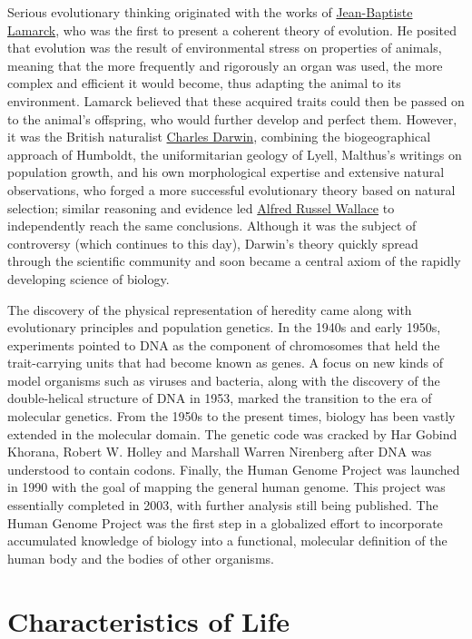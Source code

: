 Serious evolutionary thinking originated with the works of \href{https://en.wikipedia.org/wiki/Jean-Baptiste_Lamarck}{Jean-Baptiste Lamarck}, who was the first to present a coherent theory of evolution. He posited that evolution was the result of environmental stress on properties of animals, meaning that the more frequently and rigorously an organ was used, the more complex and efficient it would become, thus adapting the animal to its environment. Lamarck believed that these acquired traits could then be passed on to the animal's offspring, who would further develop and perfect them. However, it was the British naturalist \href{https://en.wikipedia.org/wiki/Charles_Darwin}{Charles Darwin}, combining the biogeographical approach of Humboldt, the uniformitarian geology of Lyell, Malthus's writings on population growth, and his own morphological expertise and extensive natural observations, who forged a more successful evolutionary theory based on natural selection; similar reasoning and evidence led \href{https://en.wikipedia.org/wiki/Alfred_Russel_Wallace}{Alfred Russel Wallace} to independently reach the same conclusions. Although it was the subject of controversy (which continues to this day), Darwin's theory quickly spread through the scientific community and soon became a central axiom of the rapidly developing science of biology.

The discovery of the physical representation of heredity came along with evolutionary principles and population genetics. In the 1940s and early 1950s, experiments pointed to DNA as the component of chromosomes that held the trait-carrying units that had become known as genes. A focus on new kinds of model organisms such as viruses and bacteria, along with the discovery of the double-helical structure of DNA in 1953, marked the transition to the era of molecular genetics. From the 1950s to the present times, biology has been vastly extended in the molecular domain. The genetic code was cracked by Har Gobind Khorana, Robert W. Holley and Marshall Warren Nirenberg after DNA was understood to contain codons. Finally, the Human Genome Project was launched in 1990 with the goal of mapping the general human genome. This project was essentially completed in 2003, with further analysis still being published. The Human Genome Project was the first step in a globalized effort to incorporate accumulated knowledge of biology into a functional, molecular definition of the human body and the bodies of other organisms.

\hypertarget{characteristics-of-life}{%
\section{Characteristics of Life}\label{characteristics-of-life}}

